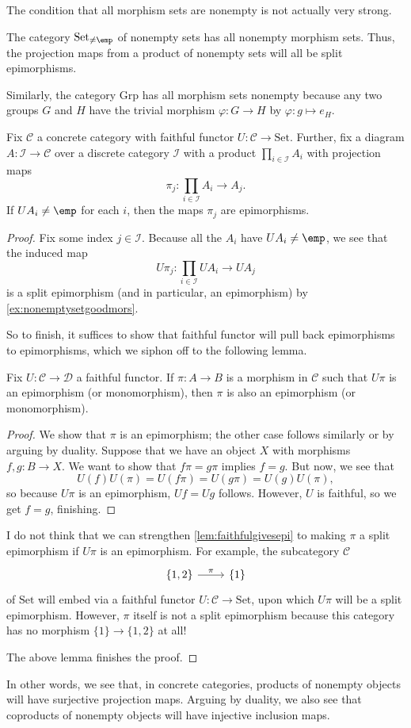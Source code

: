 \documentclass[../notes.tex]{subfiles}
\begin{document}
The condition that all morphism sets are nonempty is not actually very strong.
\begin{example} \label{ex:nonemptysetgoodmors}
	The category $\mathrm{Set}_{\ne\emp}$ of nonempty sets has all nonempty morphism sets. Thus, the projection maps from a product of nonempty sets will all be split epimorphisms.
\end{example}
\begin{ex}
	Similarly, the category $\mathrm{Grp}$ has all morphism sets nonempty because any two groups $G$ and $H$ have the trivial morphism $\varphi:G\to H$ by $\varphi:g\mapsto e_H$.
\end{ex}
\begin{corollary}
	Fix $\mathcal C$ a concrete category with faithful functor $U:\mathcal C\to\mathrm{Set}$. Further, fix a diagram $A:\mathcal I\to\mathcal C$ over a discrete category $\mathcal I$ with a product $\prod_{i\in\mathcal I}A_i$ with projection maps
	\[\pi_j:\prod_{i\in\mathcal I}A_i\to A_j.\]
	If $UA_i\ne\emp$ for each $i$, then the maps $\pi_j$ are epimorphisms.
\end{corollary}
\begin{proof}
	Fix some index $j\in\mathcal I$. Because all the $A_i$ have $UA_i\ne\emp$, we see that the induced map
	\[U\pi_j:\prod_{i\in\mathcal I}UA_i\to UA_j\]
	is a split epimorphism (and in particular, an epimorphism) by \autoref{ex:nonemptysetgoodmors}.

	So to finish, it suffices to show that faithful functor will pull back epimorphisms to epimorphisms, which we siphon off to the following lemma.
	\begin{lemma} \label{lem:faithfulgivesepi}
		Fix $U:\mathcal C\to\mathcal D$ a faithful functor. If $\pi:A\to B$ is a morphism in $\mathcal C$ such that $U\pi$ is an epimorphism (or monomorphism), then $\pi$ is also an epimorphism (or monomorphism).
	\end{lemma}
	\begin{proof}
		We show that $\pi$ is an epimorphism; the other case follows similarly or by arguing by duality. Suppose that we have an object $X$ with morphisms $f,g:B\to X$. We want to show that $f\pi=g\pi$ implies $f=g$. But now, we see that
		\[U(f)U(\pi)=U(f\pi)=U(g\pi)=U(g)U(\pi),\]
		so because $U\pi$ is an epimorphism, $Uf=Ug$ follows. However, $U$ is faithful, so we get $f=g$, finishing.
	\end{proof}
	\begin{remark}[Nir]
		I do not think that we can strengthen \autoref{lem:faithfulgivesepi} to making $\pi$ a split epimorphism if $U\pi$ is an epimorphism. For example, the subcategory $\mathcal C$
		\[\begin{tikzcd}
			{\{1,2\}} & {\{1\}}
			\arrow["\pi", from=1-1, to=1-2]
		\end{tikzcd}\]
		of $\mathrm{Set}$ will embed via a faithful functor $U:\mathcal C\to\mathrm{Set}$, upon which $U\pi$ will be a split epimorphism. However, $\pi$ itself is not a split epimorphism because this category has no morphism $\{1\}\to\{1,2\}$ at all!
	\end{remark}
	The above lemma finishes the proof.
\end{proof}
In other words, we see that, in concrete categories, products of nonempty objects will have surjective projection maps. Arguing by duality, we also see that coproducts of nonempty objects will have injective inclusion maps.
\end{document}
